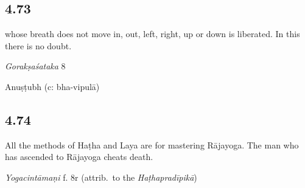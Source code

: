 \begin{ekdosis}
\subsection*{4.73}
\begin{translation} whose breath does not move in, out, left, right, up or down is liberated. In this there is no doubt.
\end{translation}

\begin{sources}[hp04_073]
\emph{Gorakṣaśataka} 8
\begin{versinnote}
\end{versinnote}
\end{sources}



\begin{metre}[hp04_073]
Anuṣṭubh (c: bha-vipulā)
\end{metre}

\subsection*{4.74}
\begin{translation}[hp04_074]
All the methods of Haṭha and Laya are for mastering Rājayoga. The man who has ascended to Rājayoga cheats death.
\end{translation}


\begin{testimonia}[hp04_074]
\emph{Yogacintāmaṇi} f. 8r (attrib.~to the \emph{Haṭhapradīpikā})
\begin{versinnote}
\end{versinnote}


\end{testimonia}
\end{ekdosis}
